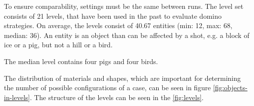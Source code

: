 To ensure comparability, settings must be the same between runs.
The level set consists of 21 levels, that have been used in the past to evaluate domino strategies. On average, the levels consist of 40.67 entities (min: 12, max: 68, median: 36). An entity is an object than can be affected by a shot, e.g. a block of ice or a pig, but not a hill or a bird.

The median level contains four pigs and four birds.

The distribution of materials and shapes, which are important for determining the number of possible configurations of a case, can be seen in figure \ref{fig:objects-in-levels}. The structure of the levels can be seen in the \ref{fig:levels}.

